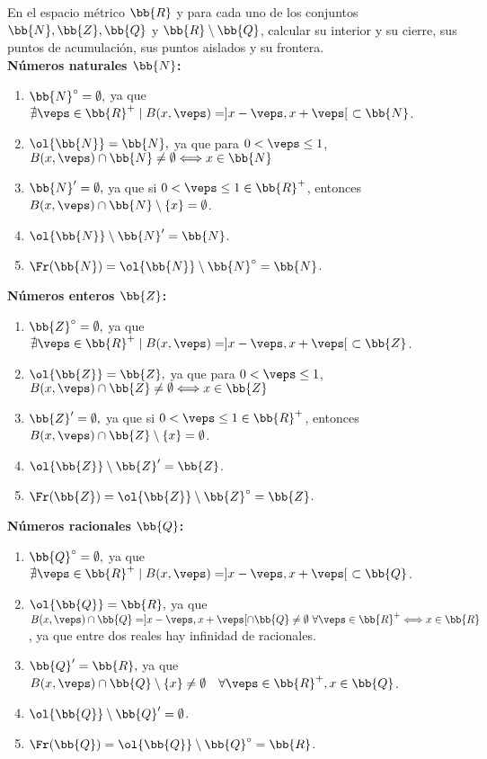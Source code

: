 \begin{ejercicio}
    En el espacio métrico $\bb{R}$ y para cada uno de los conjuntos $\bb{N}, \bb{Z}, \bb{Q}$ y $\bb{R}\setminus \bb{Q}$, calcular su interior y su cierre, sus puntos de acumulación, sus puntos aislados y su frontera.\\

    \textbf{Números naturales $\bb{N}$:}
    \begin{enumerate}
        \item $\bb{N}^\circ = \emptyset,$ ya que $\nexists \veps\in \bb{R}^+\mid B(x,\veps)=]x-\veps, x+\veps[~\subset \bb{N}$.
        \item $\ol{\bb{N}} = \bb{N},$ ya que para $0<\veps\leq 1$, $B(x,\veps)\cap \bb{N}\neq \emptyset \Longleftrightarrow x\in \bb{N}$
        \item ${\bb{N}}' = \emptyset,$ ya que si $0<\veps\leq 1\in \bb{R}^+$, entonces $B(x,\veps)\cap \bb{N}\setminus\{x\} = \emptyset$.
        \item $\ol{\bb{N}}\setminus {\bb{N}}' =\bb{N}$.
        \item $\Fr(\bb{N})=\ol{\bb{N}}\setminus \bb{N}^\circ=\bb{N}$.
    \end{enumerate}

    \textbf{Números enteros $\bb{Z}$:}
    \begin{enumerate}
        \item $\bb{Z}^\circ = \emptyset,$ ya que $\nexists \veps\in \bb{R}^+\mid B(x,\veps)=]x-\veps, x+\veps[~\subset \bb{Z}$.
        \item $\ol{\bb{Z}} = \bb{Z},$ ya que para $0<\veps\leq 1$, $B(x,\veps)\cap \bb{Z}\neq \emptyset \Longleftrightarrow x\in \bb{Z}$
        \item ${\bb{Z}}' = \emptyset,$ ya que si $0<\veps\leq 1\in \bb{R}^+$, entonces $B(x,\veps)\cap \bb{Z}\setminus\{x\} = \emptyset$.
        \item $\ol{\bb{Z}}\setminus {\bb{Z}}' =\bb{Z}$.
        \item $\Fr(\bb{Z})=\ol{\bb{Z}}\setminus \bb{Z}^\circ=\bb{Z}$.
    \end{enumerate}

    \textbf{Números racionales $\bb{Q}$:}
    \begin{enumerate}
        \item $\bb{Q}^\circ = \emptyset,$ ya que $\nexists \veps\in \bb{R}^+\mid B(x,\veps)=]x-\veps, x+\veps[~\subset \bb{Q}$.
        \item $\ol{\bb{Q}} = \bb{R},$ ya que $B(x,\veps)\cap \bb{Q} = ]x-\veps, x+\veps[\cap \bb{Q}\neq \emptyset ~\forall \veps\in \bb{R}^+ \Longleftrightarrow x\in \bb{R}$, ya que entre dos reales hay infinidad de racionales.
        \item ${\bb{Q}}' = \bb{R},$ ya que $B(x,\veps)\cap \bb{Q}\setminus\{x\} \neq \emptyset \quad \forall \veps\in \bb{R}^+, x\in \bb{Q}$.
        \item $\ol{\bb{Q}}\setminus {\bb{Q}}' =\emptyset$.
        \item $\Fr(\bb{Q})=\ol{\bb{Q}}\setminus \bb{Q}^\circ=\bb{R}$.
    \end{enumerate}


\end{ejercicio}
